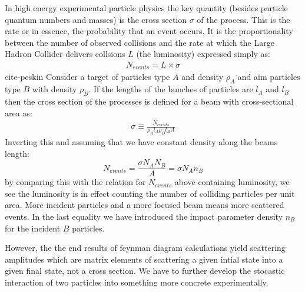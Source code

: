 In high energy experimental particle physics the key quantity (besides particle quantum numbers and masses) is the
cross section $\sigma$ of the process. This is the rate or in essence, the probability that an event occurs. It is the proportionality between the number of observed collisions and the rate at which the Large Hadron Collider delivers collsions $L$ (the luminosity)
 expressed simply as:
\begin{align*}
N_{events} = L \times \sigma
\end{align*}
cite-peskin
Consider a target of particles type $A$ and density $\rho_A$ and aim particles type 
$B$ with density $\rho_B$. If the lengths of the bunches of particles are $l_A$ and $l_B$ 
then the cross section of the processes is defined for a beam with cross-sectional area as:
\begin{align*}
\sigma \equiv \frac{N_{events}}{\rho_A l_A \rho_B l_B A}
\end{align*}
Inverting this and assuming that we have constant density along the beams length:
\begin{equation}\label{eq:sigma}
N_{events} = \frac{\sigma N_A N_B}{A} = \sigma{N_A n_B}
\end{equation}
by comparing this with the relation for $N_{events}$ above containing luminosity, we see the
 luminosity is in effect counting the number of colliding particles per unit area.
 More incident particles and a more focused beam means more scattered events. 
In the last equality we have introduced the impact parameter density $n_B$ for
 the incident $B$ particles.

However, the the end results of feynman diagram calculations yield scattering amplitudes
which are matrix elements of scattering a given intial state into a given final state, not
a cross section. We have to further develop the stocastic interaction of two particles into
something more concrete experimentally.
 
